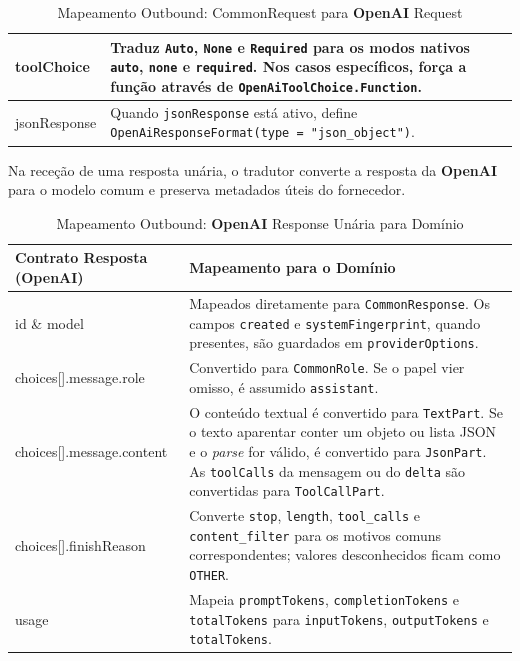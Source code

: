 \begin{table}[H]
\begin{tabularx}{\textwidth}{|>{\ttfamily\raggedright\arraybackslash}p{4cm}|Y|}
            \hline
            toolChoice & Traduz \texttt{Auto}, \texttt{None} e \texttt{Required} para os modos nativos \texttt{auto}, \texttt{none} e \texttt{required}. Nos casos específicos, força a função através de \texttt{OpenAiToolChoice.Function}. \\
            \hline
            jsonResponse & Quando \texttt{jsonResponse} está ativo, define \texttt{OpenAiResponseFormat(type = "json\_object")}. \\
            \hline
        \end{tabularx}
        \caption{Mapeamento Outbound: CommonRequest para \textbf{OpenAI} Request}
    \end{table}

    Na receção de uma resposta unária, o tradutor converte a resposta da \textbf{OpenAI} para o modelo comum e preserva metadados úteis do fornecedor.

    \begin{table}[H]
        \centering
        \footnotesize
        \renewcommand{\arraystretch}{1.25}
        \begin{tabularx}{\textwidth}{|>{\ttfamily\raggedright\arraybackslash}p{4cm}|Y|}
            \hline
            \textbf{Contrato Resposta (OpenAI)} & \textbf{Mapeamento para o Domínio} \\
            \hline
            id \& model & Mapeados diretamente para \texttt{CommonResponse}. Os campos \texttt{created} e \texttt{systemFingerprint}, quando presentes, são guardados em \texttt{providerOptions}. \\
            \hline
            choices[].message.role & Convertido para \texttt{CommonRole}. Se o papel vier omisso, é assumido \texttt{assistant}. \\
            \hline
            choices[].message.content & O conteúdo textual é convertido para \texttt{TextPart}. Se o texto aparentar conter um objeto ou lista JSON e o \textit{parse} for válido, é convertido para \texttt{JsonPart}. As \texttt{toolCalls} da mensagem ou do \texttt{delta} são convertidas para \texttt{ToolCallPart}. \\
            \hline
            choices[].finishReason & Converte \texttt{stop}, \texttt{length}, \texttt{tool\_calls} e \texttt{content\_filter} para os motivos comuns correspondentes; valores desconhecidos ficam como \texttt{OTHER}. \\
            \hline
            usage & Mapeia \texttt{promptTokens}, \texttt{completionTokens} e \texttt{totalTokens} para \texttt{inputTokens}, \texttt{outputTokens} e \texttt{totalTokens}. \\
            \hline
        \end{tabularx}
        \caption{Mapeamento Outbound: \textbf{OpenAI} Response Unária para Domínio}
    \end{table}

